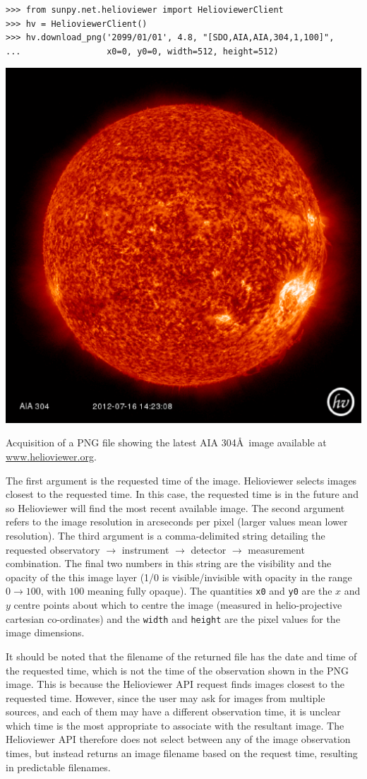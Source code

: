 \begin{listing}[H]
\begin{verbatim}
>>> from sunpy.net.helioviewer import HelioviewerClient
>>> hv = HelioviewerClient()
>>> hv.download_png('2099/01/01', 4.8, "[SDO,AIA,AIA,304,1,100]",
...                 x0=0, y0=0, width=512, height=512)
\end{verbatim}
\centering\includegraphics[width=0.5\columnwidth]{helioviewer_latest_aia_304}
\caption{Acquisition of a PNG file showing the latest AIA 304\AA\ image 
available at \url{www.helioviewer.org}.}
\label{code:hv:downloadlatestpng}
\end{listing}

The first argument is the requested time of the image.  Helioviewer
selects images closest to the requested time.  In this case, the
requested time is in the future and so Helioviewer will find the most
recent available image.  The second argument refers to the image
resolution in arcseconds per pixel (larger values mean lower
resolution).  The third argument is a comma-delimited string detailing
the requested observatory $\rightarrow$ instrument $\rightarrow$
detector $\rightarrow$ measurement combination.  The final two numbers
in this string are the visibility and the opacity of the this image
layer (1/0 is visible/invisible with opacity in the range
$0\rightarrow100$, with $100$ meaning fully opaque).  The quantities
\texttt{x0} and \texttt{y0} are the $x$ and $y$ centre points about which to centre
the image (measured in helio-projective cartesian co-ordinates) and
the \texttt{width} and \texttt{height} are the pixel values for the
image dimensions.

It should be noted that the filename of the returned file has the date
and time of the requested time, which is not the time of the observation shown 
in the PNG image.  This is because the Helioviewer API request finds images 
closest to the requested time. However, since the user may ask for images from 
multiple sources, and each of them may have a different observation time, it is
unclear which time is the most appropriate to associate with the resultant 
image.  The Helioviewer API therefore does not select between any of the image 
observation times, but instead returns an image filename based on the request 
time, resulting in predictable filenames.

